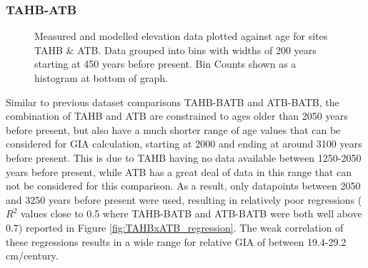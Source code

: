\subsubsection{TAHB-ATB}

\begin{figure}[H]
	\caption{Measured and modelled elevation data plotted against age for sites TAHB \& ATB. Data grouped into bins with widths of 200 years starting at 450 years before present. Bin Counts shown as a histogram at bottom of graph.}	
	\label{fig:data_TAHBxATB}
\end{figure}

Similar to previous dataset comparisons TAHB-BATB and ATB-BATB, the combination of TAHB and ATB are constrained to
ages older than
2050 years before present, but also have a much shorter range
of age values that
can be considered for GIA calculation, starting at 2000 and ending at around 3100 years before present.
This is due to TAHB having no data available between 1250-2050 years before present, while ATB
has a great deal of data in this range that can not be considered for this
comparison. As a result, only datapoints between 2050 and 3250 years before present
were used, resulting in
relatively poor regressions ($R^2$ values close to 0.5 where TAHB-BATB and ATB-BATB
were both well above 0.7) reported in Figure \ref{fig:TAHBxATB_regression}.
The weak correlation of these regressions results in a wide range for
relative GIA of between 19.4-29.2 cm/century. \\


